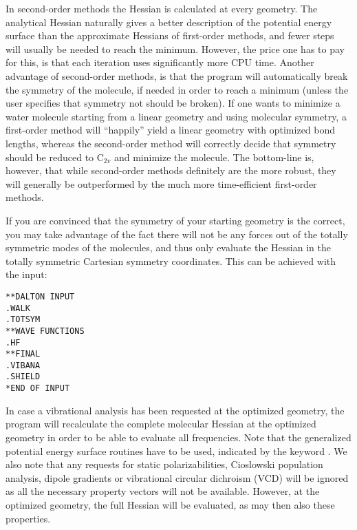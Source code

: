 In second-order methods the Hessian is calculated at every
geometry. The analytical Hessian naturally gives a better description
of the potential energy surface than the approximate Hessians of
first-order methods, and fewer steps will usually be needed to reach
the minimum. However, the price one has to pay for this, is that each
iteration uses significantly more CPU time. Another advantage of
second-order methods, is that the program will automatically break the
symmetry of the molecule, if needed in order
to reach a minimum
(unless the user specifies that symmetry not should be broken). If
one wants to minimize a water molecule starting from a linear
geometry and using molecular symmetry, a first-order method will
``happily'' yield a linear geometry with optimized bond lengths, whereas
the second-order method will correctly decide that symmetry should be
reduced to C$_{2v}$ and minimize the molecule.
The bottom-line is, however, that while second-order methods
definitely are the more robust, they will generally be outperformed by
the much more time-efficient first-order methods.

If you are convinced that the symmetry of your starting geometry
is the correct, you may take advantage of the fact there will not
be any forces out of the totally symmetric modes of the molecules,
and thus only evaluate the Hessian in the totally symmetric
Cartesian symmetry coordinates. This can be achieved with the
input:

\begin{verbatim}
**DALTON INPUT
.WALK
.TOTSYM
**WAVE FUNCTIONS
.HF
**FINAL
.VIBANA
.SHIELD
*END OF INPUT
\end{verbatim}

In case a vibrational analysis has been requested at the optimized
geometry, the program will recalculate the complete molecular Hessian
at the optimized geometry in order to be able to evaluate all
frequencies. Note that the generalized potential energy surface
routines have to be used, indicated by the keyword . We also
note that any requests for static
polarizabilities, Cioslowski population
analysis, dipole gradients or vibrational circular dichroism (VCD) will be ignored as all the necessary
property vectors will not be available. However, at the optimized
geometry, the full Hessian will be evaluated, as may then also these
properties.


